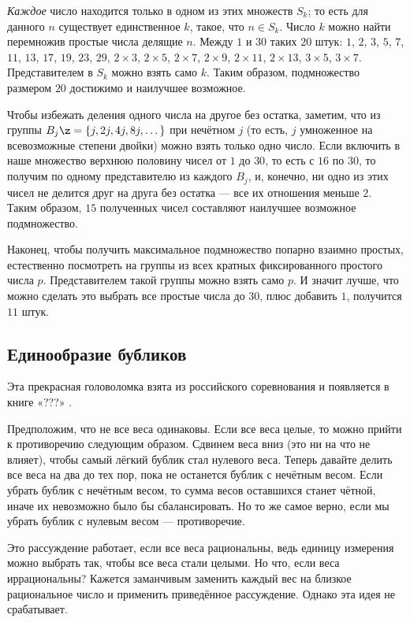 \emph{Каждое} число находится только в одном из этих множеств $S_k$;
то есть для данного $n$ существует единственное $k$, такое, что $n \in S_k$.
Число $k$ можно найти перемножив простые числа делящие $n$.
Между $1$ и $30$ таких $20$ штук: $1$, $2$, $3$, $5$, $7$, $11$, $13$, $17$, $19$,
$23$, $29$, $2 \times 3$, $2 \times 5$, $2 \times 7$, $2 \times 9$, $2 \times 11$, $2 \times 13$, $3 \times 5$, $3 \times 7$.
Представителем в $S_k$ можно взять само $k$.
Таким образом, подмножество размером $20$ достижимо и наилучшее возможное.

Чтобы избежать деления одного числа на другое без остатка, заметим, что из группы $B_j \z= \{j, 2j, 4j, 8j, \dots\}$ при нечётном $j$ (то есть, $j$ умноженное на всевозможные степени двойки) можно взять только одно число.
Если включить в наше множество верхнюю половину чисел от $1$ до $30$, то есть с $16$ по $30$, то получим по одному представителю из каждого $B_j$, и, конечно, ни одно из этих чисел не делится друг на друга без остатка --- все их отношения меньше $2$.
Таким образом, $15$ полученных чисел составляют наилучшее возможное подмножество.

Наконец, чтобы получить максимальное подмножество попарно взаимно простых, естественно посмотреть на группы из всех кратных фиксированного простого числа $p$.
Представителем такой группы можно взять само $p$. 
И значит лучше, что можно сделать это выбрать все простые числа до $30$, плюс добавить $1$, получится $11$ штук.

\subsection*{Единообразие бубликов}

Эта прекрасная головоломка взята из российского соревнования и появляется в книге «???» \cite{shklarsky-chentzov-yaglom}.

Предположим, что не все веса одинаковы.
Если все веса целые, то можно прийти к противоречию следующим образом.
Сдвинем веса вниз (это ни на что не влияет), чтобы самый лёгкий бублик стал нулевого веса.
Теперь давайте делить все веса на два до тех пор, пока не останется бублик с нечётным весом.
Если убрать бублик с нечётным весом, то сумма весов оставшихся станет чётной, иначе их невозможно было бы сбалансировать.
Но то же самое верно, если мы убрать бублик с нулевым весом --- противоречие.

Это рассуждение работает, если все веса рациональны, ведь единицу измерения можно выбрать так, чтобы все веса стали целыми.
Но что, если веса иррациональны?
Кажется заманчивым заменить каждый вес на близкое рациональное число и применить приведённое рассуждение.
Однако эта идея не срабатывает.

